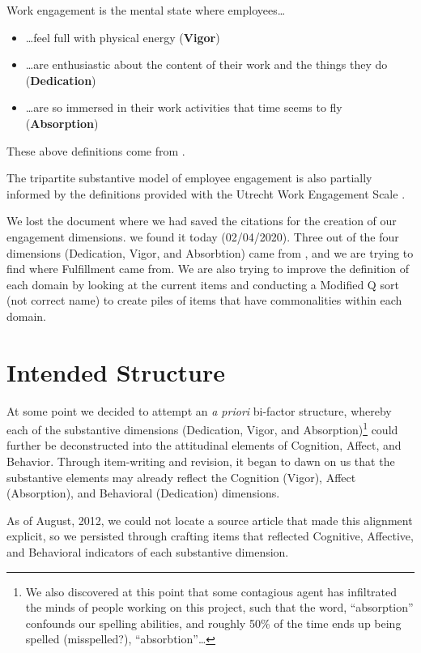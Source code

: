 \documentclass[
]{book}
\providecommand{\tightlist}{%
  \setlength{\itemsep}{0pt}\setlength{\parskip}{0pt}}
\begin{document}
Work engagement is the mental state where employees\ldots{}

\begin{itemize}
\tightlist
\item
  \ldots feel full with physical energy (\textbf{Vigor})
\item
  \ldots are enthusiastic about the content of their work and the things they do (\textbf{Dedication})
\item
  \ldots are so immersed in their work activities that time seems to fly (\textbf{Absorption})
\end{itemize}

These above definitions come from \citet{bakker_job_2017}.

The tripartite substantive model of employee engagement is also partially informed by the definitions provided with the Utrecht Work Engagement Scale \citep{schaufeli_utrecht_2003}.

We lost the document where we had saved the citations for the creation of our engagement dimensions. we found it today (02/04/2020).
Three out of the four dimensions (Dedication, Vigor, and Absorbtion) came from \citet{schaufeli_measurement_2002}, and we are trying to find where Fulfillment came from.
We are also trying to improve the definition of each domain by looking at the current items and conducting a Modified Q sort (not correct name) to create piles of items that have commonalities within each domain.

\hypertarget{ABCDAV}{%
\section{Intended Structure}\label{ABCDAV}}

At some point we decided to attempt an \emph{a priori} bi-factor structure, whereby each of the substantive dimensions (Dedication, Vigor, and Absorption)\footnote{We also discovered at this point that some contagious agent has infiltrated the minds of people working on this project, such that the word, ``absorption'' confounds our spelling abilities, and roughly 50\% of the time ends up being spelled (misspelled?), ``absorbtion''\ldots{}} could further be deconstructed into the attitudinal elements of Cognition, Affect, and Behavior. Through item-writing and revision, it began to dawn on us that the substantive elements may already reflect the Cognition (Vigor), Affect (Absorption), and Behavioral (Dedication) dimensions.

As of August, 2012, we could not locate a source article that made this alignment explicit, so we persisted through crafting items that reflected Cognitive, Affective, and Behavioral indicators of each substantive dimension.
\end{document}
